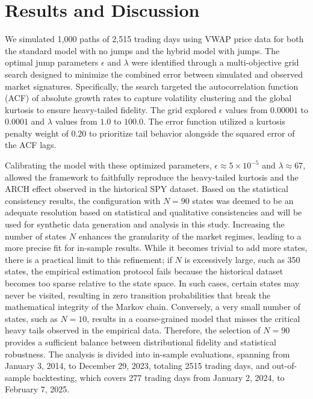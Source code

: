 \documentclass[11pt, letterpaper]{article}
\begin{document}
\section{Results and Discussion}

We simulated 1,000 paths of 2,515 trading days using VWAP price data for both the standard model with no jumps and the hybrid model with jumps. The optimal jump parameters $\epsilon$ and $\lambda$ were identified through a multi-objective grid search designed to minimize the combined error between simulated and observed market signatures. Specifically, the search targeted the autocorrelation function (ACF) of absolute growth rates to capture volatility clustering and the global kurtosis to ensure heavy-tailed fidelity. The grid explored $\epsilon$ values from $0.00001$ to $0.0001$ and $\lambda$ values from $1.0$ to $100.0$. The error function utilized a kurtosis penalty weight of $0.20$ to prioritize tail behavior alongside the squared error of the ACF lags.

Calibrating the model with these optimized parameters, $\epsilon \approx 5 \times 10^{-5}$ and $\lambda \approx 67$, allowed the framework to faithfully reproduce the heavy-tailed kurtosis and the ARCH effect observed in the historical SPY dataset. Based on the statistical consistency results, the configuration with $N=90$ states was deemed to be an adequate resolution based on statistical and qualitative consistencies and will be used for synthetic data generation and analysis in this study. Increasing the number of states $N$ enhances the granularity of the market regimes, leading to a more precise fit for in-sample results. While it becomes trivial to add more states, there is a practical limit to this refinement; if $N$ is excessively large, such as 350 states, the empirical estimation protocol fails because the historical dataset becomes too sparse relative to the state space. In such cases, certain states may never be visited, resulting in zero transition probabilities that break the mathematical integrity of the Markov chain. Conversely, a very small number of states, such as $N=10$, results in a coarse-grained model that misses the critical heavy tails observed in the empirical data. Therefore, the selection of $N=90$ provides a sufficient balance between distributional fidelity and statistical robustness. The analysis is divided into in-sample evaluations, spanning from January 3, 2014, to December 29, 2023, totaling 2515 trading days, and out-of-sample backtesting, which covers 277 trading days from January 2, 2024, to February 7, 2025.
\end{document}
